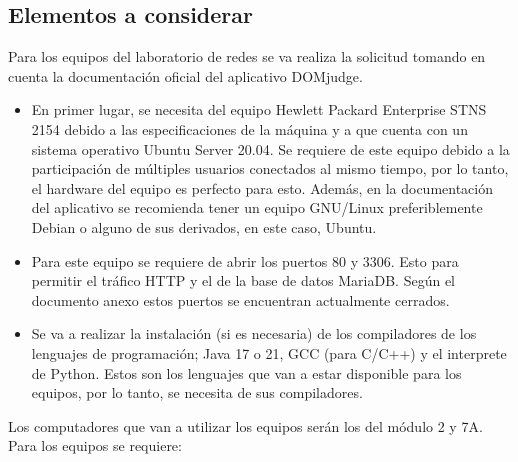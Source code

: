 \documentclass{article}
\begin{document}
\subsection{Elementos a considerar}

Para los equipos del laboratorio de redes se va realiza la solicitud tomando en cuenta la documentación oficial del aplicativo DOMjudge\cite{domjudge-docs}.

\begin{itemize}
  \item En primer lugar, se necesita del equipo Hewlett Packard Enterprise STNS 2154 debido a las especificaciones de la máquina y a que cuenta con un sistema operativo Ubuntu Server 20.04. Se requiere de este equipo debido a la participación de múltiples usuarios conectados al mismo tiempo, por lo tanto, el hardware del equipo es perfecto para esto. Además, en la documentación del aplicativo se recomienda tener un equipo GNU/Linux preferiblemente Debian o alguno de sus derivados, en este caso, Ubuntu.
  \item Para este equipo se requiere de abrir los puertos \(80\) y \(3306\). Esto para permitir el tráfico HTTP y el de la base de datos MariaDB. Según el documento anexo estos puertos se encuentran actualmente cerrados.
  \item Se va a realizar la instalación (si es necesaria) de los compiladores de los lenguajes de programación; Java 17\cite{oracle-java} o 21, GCC\cite{gcc} (para C/C++) y el interprete de Python\cite{python-downloads}. Estos son los lenguajes que van a estar disponible para los equipos, por lo tanto, se necesita de sus compiladores.
\end{itemize}

Los computadores que van a utilizar los equipos serán los del módulo 2 y 7A. Para los equipos se requiere:
\end{document}

